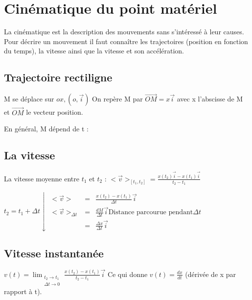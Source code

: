 \chapter{Cinématique du point matériel}

La cinématique est la description des mouvements sans s'intéressé à leur causes.
Pour décrire un mouvement il faut connaître les trajectoires (position en fonction du temps), la vitesse ainsi que la vitesse et son accélération.

\section{Trajectoire rectiligne}


M se déplace sur $ox, (o, \vec{i})$ On repère M par $\overrightarrow{OM} = x\vec{i}$ avec x l'abscisse de M et $\overrightarrow{OM}$ le vecteur position.

En général, M dépend de t : 

\section{La vitesse}

La vitesse moyenne entre $t_1$ et $t_2$ : $<\vec{v}>_{[t_1, t_2]}= \frac{x(t_2)\vec{i} - x(t_1)\vec{i}}{t_2-t_1}$

$t_2=t_1+\Delta t \downarrow  \begin{array}{rcl} <\vec{v}> &=& \frac{x(t_2) - x(t_1)}{\Delta t} \vec{i} \\
<\vec{v}>_{\Delta t} &=& \frac{dM}{\Delta t} \vec{i} \text{Distance parcourue pendant} \Delta t \\
&=& \frac{\Delta x}{\Delta t}\vec{i}
\end{array}$

\section{Vitesse instantanée}

$v(t) = \lim_{\substack{t_2 \to t_1 \\ \Delta t \to 0}} \frac{x(t_2) - x(t_1)}{t_2 - t_1}\vec{i}$
	Ce qui donne $v(t) = \frac{dx}{dt}$ (dérivée de x par rapport à t).

